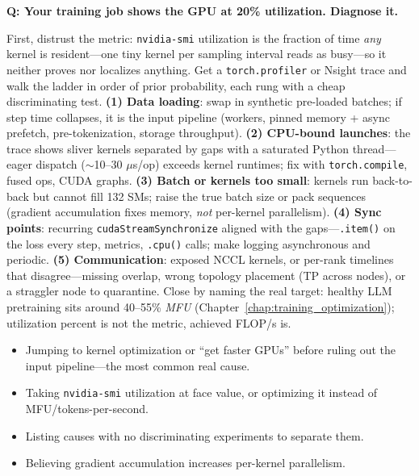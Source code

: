 \begin{interviewq}
\end{interviewq}

\begin{interviewq}
\textbf{Q: Your training job shows the GPU at 20\% utilization. Diagnose it.}

 \quad {} \quad \badgefreq{\freqhigh}

\stronganswer First, distrust the metric: \texttt{nvidia-smi} utilization is the fraction of time \textit{any} kernel is resident---one tiny kernel per sampling interval reads as busy---so it neither proves nor localizes anything. Get a \texttt{torch.profiler} or Nsight trace and walk the ladder in order of prior probability, each rung with a cheap discriminating test. \textbf{(1) Data loading}: swap in synthetic pre-loaded batches; if step time collapses, it is the input pipeline (workers, pinned memory + async prefetch, pre-tokenization, storage throughput). \textbf{(2) CPU-bound launches}: the trace shows sliver kernels separated by gaps with a saturated Python thread---eager dispatch ($\sim$10--30 $\mu$s/op) exceeds kernel runtimes; fix with \texttt{torch.compile}, fused ops, CUDA graphs. \textbf{(3) Batch or kernels too small}: kernels run back-to-back but cannot fill 132 SMs; raise the true batch size or pack sequences (gradient accumulation fixes memory, \textit{not} per-kernel parallelism). \textbf{(4) Sync points}: recurring \texttt{cudaStreamSynchronize} aligned with the gaps---\texttt{.item()} on the loss every step, metrics, \texttt{.cpu()} calls; make logging asynchronous and periodic. \textbf{(5) Communication}: exposed NCCL kernels, or per-rank timelines that disagree---missing overlap, wrong topology placement (TP across nodes), or a straggler node to quarantine. Close by naming the real target: healthy LLM pretraining sits around 40--55\% \textit{MFU} (Chapter~\ref{chap:training_optimization}); utilization percent is not the metric, achieved FLOP/s is.

\redflags
\begin{itemize}
    \item Jumping to kernel optimization or ``get faster GPUs'' before ruling out the input pipeline---the most common real cause.
    \item Taking \texttt{nvidia-smi} utilization at face value, or optimizing it instead of MFU/tokens-per-second.
    \item Listing causes with no discriminating experiments to separate them.
    \item Believing gradient accumulation increases per-kernel parallelism.
\end{itemize}


\end{interviewq}
